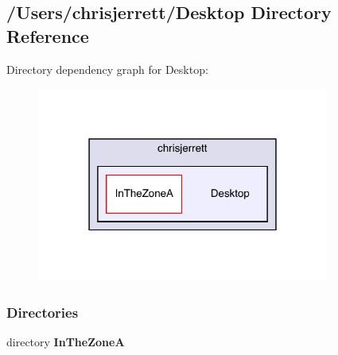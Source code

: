 \subsection{/\+Users/chrisjerrett/\+Desktop Directory Reference}
\label{dir_1bbe8f793d6c8d1043cf830483081927}
Directory dependency graph for Desktop\+:
\nopagebreak
\begin{figure}[H]
\begin{center}
\leavevmode
\includegraphics[width=272pt]{dir_1bbe8f793d6c8d1043cf830483081927_dep}
\end{center}
\end{figure}
\subsubsection*{Directories}
\begin{DoxyCompactItemize}
\item 
directory \textbf{ In\+The\+ZoneA}
\end{DoxyCompactItemize}
